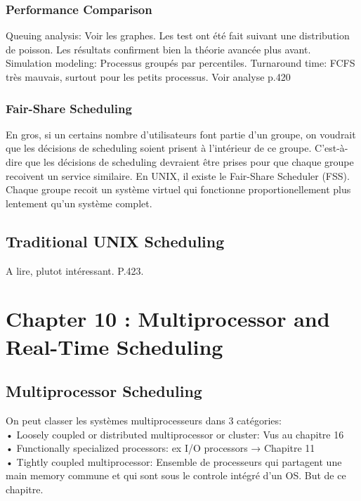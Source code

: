 \subsubsection{Performance Comparison}
Queuing analysis: Voir les graphes. Les test ont été fait suivant une distribution de poisson. Les résultats confirment bien la théorie avancée plus avant. Simulation modeling: Processus groupés par percentiles. Turnaround time: FCFS très mauvais, surtout pour les petits processus. Voir analyse p.420
\subsubsection{Fair-Share Scheduling}
En gros, si un certains nombre d’utilisateurs font partie d’un groupe, on voudrait que les décisions de scheduling soient prisent à l’intérieur de ce groupe. C’est-à-dire que les décisions de scheduling devraient être prises pour que chaque groupe recoivent un service similaire. En UNIX, il existe le Fair-Share Scheduler (FSS). Chaque groupe recoit un système virtuel qui fonctionne proportionellement plus lentement qu’un système complet.
\subsection{Traditional UNIX Scheduling}
A lire, plutot intéressant. P.423.

\newpage


\section{Chapter 10 : Multiprocessor and Real-Time Scheduling}


\subsection{Multiprocessor Scheduling}
On peut classer les systèmes multiprocesseurs dans 3 catégories: \\
• Loosely coupled or distributed multiprocessor or cluster: Vus au chapitre 16 \\
• Functionally specialized processors: ex I/O processors → Chapitre 11 \\
• Tightly coupled multiprocessor: Ensemble de processeurs qui partagent une main memory commune et qui sont sous le controle intégré d’un OS. But de ce chapitre.
